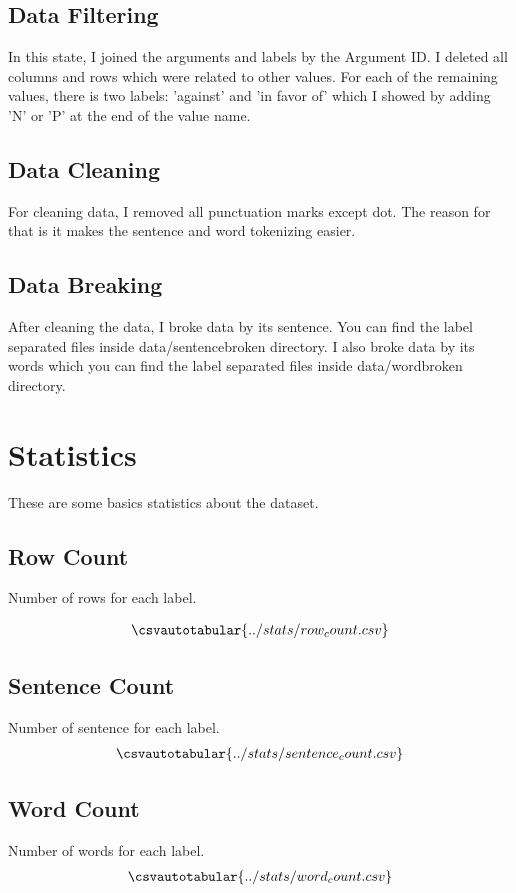 \subsection{Data Filtering}
In this state, I joined the arguments and labels by the Argument ID. I deleted all columns and rows which were related to other values.
For each of the remaining values, there is two labels: 'against' and 'in favor of' which I showed by adding 'N' or 'P' at the end of the value name.

\subsection{Data Cleaning}
For cleaning data, I removed all punctuation marks except dot. The reason for that is it makes the sentence and word tokenizing easier.

\subsection{Data Breaking}
After cleaning the data, I broke data by its sentence. You can find the label separated files inside data/sentencebroken directory. I also
broke data by its words which you can find the label separated files inside data/wordbroken directory.

\section{Statistics}
These are some basics statistics about the dataset.

\subsection{Row Count}
Number of rows for each label.

\begin{align*}
	\csvautotabular{../stats/row_count.csv}
\end{align*}

\subsection{Sentence Count}
Number of sentence for each label.
\begin{align*}
	\csvautotabular{../stats/sentence_count.csv}
\end{align*}


\subsection{Word Count}
Number of words for each label.
\begin{align*}
    \csvautotabular{../stats/word_count.csv}
\end{align*}

